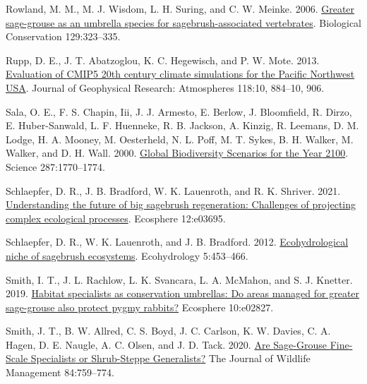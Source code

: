 \documentclass[
  12pt,
]{article}
\newlength{\cslhangindent}
\newlength{\cslentryspacingunit} %
\newenvironment{CSLReferences}[2] %
 {%
  \setlength{\parindent}{0pt}
  \ifodd #1
  \let\oldpar\par
  \def\par{\hangindent=\cslhangindent\oldpar}
  \fi
  \setlength{\parskip}{#2\cslentryspacingunit}
 }%
 {}
\begin{document}
\begin{CSLReferences}{1}{0}
\leavevmode{}%
Rowland, M. M., M. J. Wisdom, L. H. Suring, and C. W. Meinke. 2006. \href{https://doi.org/10.1016/j.biocon.2005.10.048}{Greater sage-grouse as an umbrella species for sagebrush-associated vertebrates}. Biological Conservation 129:323--335.

\leavevmode{}%
Rupp, D. E., J. T. Abatzoglou, K. C. Hegewisch, and P. W. Mote. 2013. \href{https://doi.org/10.1002/jgrd.50843}{Evaluation of {CMIP5} 20th century climate simulations for the {Pacific} {Northwest} {USA}}. Journal of Geophysical Research: Atmospheres 118:10, 884--10, 906.

\leavevmode{}%
Sala, O. E., F. S. Chapin, Iii, J. J. Armesto, E. Berlow, J. Bloomfield, R. Dirzo, E. Huber-Sanwald, L. F. Huenneke, R. B. Jackson, A. Kinzig, R. Leemans, D. M. Lodge, H. A. Mooney, M. Oesterheld, N. L. Poff, M. T. Sykes, B. H. Walker, M. Walker, and D. H. Wall. 2000. \href{https://doi.org/10.1126/science.287.5459.1770}{Global {Biodiversity} {Scenarios} for the {Year} 2100}. Science 287:1770--1774.

\leavevmode{}%
Schlaepfer, D. R., J. B. Bradford, W. K. Lauenroth, and R. K. Shriver. 2021. \href{https://doi.org/10.1002/ecs2.3695}{Understanding the future of big sagebrush regeneration: Challenges of projecting complex ecological processes}. Ecosphere 12:e03695.

\leavevmode{}%
Schlaepfer, D. R., W. K. Lauenroth, and J. B. Bradford. 2012. \href{https://doi.org/10.1002/eco.238}{Ecohydrological niche of sagebrush ecosystems}. Ecohydrology 5:453--466.

\leavevmode{}%
Smith, I. T., J. L. Rachlow, L. K. Svancara, L. A. McMahon, and S. J. Knetter. 2019. \href{https://doi.org/10.1002/ecs2.2827}{Habitat specialists as conservation umbrellas: {Do} areas managed for greater sage-grouse also protect pygmy rabbits?} Ecosphere 10:e02827.

\leavevmode{}%
Smith, J. T., B. W. Allred, C. S. Boyd, J. C. Carlson, K. W. Davies, C. A. Hagen, D. E. Naugle, A. C. Olsen, and J. D. Tack. 2020. \href{https://doi.org/10.1002/jwmg.21837}{Are {Sage}-{Grouse} {Fine}-{Scale} {Specialists} or {Shrub}-{Steppe} {Generalists}?} The Journal of Wildlife Management 84:759--774.


\end{CSLReferences}
\end{document}
